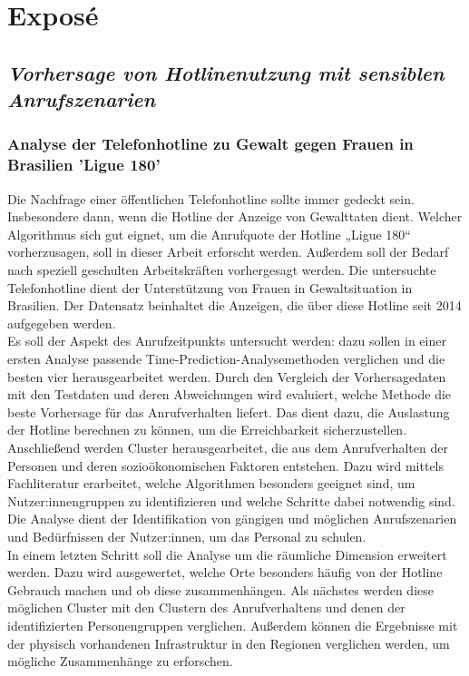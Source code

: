 \documentclass[12pt]{scrartcl}
\begin{document}
	\pagestyle{fancy}
	\renewcommand{\headrulewidth}{0.1 pt}
	\renewcommand{\footrulewidth}{0 pt}
	\section*{Exposé}
	\subsection*{\textit{Vorhersage von Hotlinenutzung mit sensiblen Anrufszenarien}}
	\subsubsection*{Analyse der Telefonhotline zu Gewalt gegen Frauen in Brasilien 'Ligue 180'}
	Die Nachfrage einer öffentlichen Telefonhotline sollte immer gedeckt sein. Insbesondere dann, wenn die Hotline der Anzeige von Gewalttaten dient. Welcher Algorithmus sich gut eignet, um die Anrufquote der Hotline „Ligue 180“ vorherzusagen, soll in dieser Arbeit erforscht werden. Außerdem soll der Bedarf nach speziell geschulten Arbeitskräften vorhergesagt werden. Die untersuchte Telefonhotline dient der Unterstützung von Frauen in Gewaltsituation in Brasilien. Der Datensatz beinhaltet die Anzeigen, die über diese Hotline seit 2014 aufgegeben werden.\\
	Es soll der Aspekt des Anrufzeitpunkts untersucht werden: dazu sollen in einer ersten Analyse passende Time-Prediction-Analysemethoden verglichen und die besten vier herausgearbeitet werden. Durch den Vergleich der Vorhersagedaten mit den Testdaten und deren Abweichungen wird evaluiert, welche Methode die beste Vorhersage für das Anrufverhalten liefert. Das dient dazu, die Auslastung der Hotline berechnen zu können, um die Erreichbarkeit sicherzustellen.\\
	Anschließend werden Cluster herausgearbeitet, die aus dem Anrufverhalten der Personen und deren sozioökonomischen Faktoren entstehen. Dazu wird mittels Fachliteratur erarbeitet, welche Algorithmen besonders geeignet sind, um Nutzer:innengruppen zu identifizieren und welche Schritte dabei notwendig sind. Die Analyse dient der Identifikation von gängigen und möglichen Anrufszenarien und Bedürfnissen der Nutzer:innen, um das Personal zu schulen.\\
	In einem letzten Schritt soll die Analyse um die räumliche Dimension erweitert werden. Dazu wird ausgewertet, welche Orte besonders häufig von der Hotline Gebrauch machen und ob diese zusammenhängen. Als nächstes werden diese möglichen Cluster mit den Clustern des Anrufverhaltens und denen der identifizierten Personengruppen verglichen. Außerdem können die Ergebnisse mit der physisch vorhandenen Infrastruktur in den Regionen verglichen werden, um mögliche Zusammenhänge zu erforschen. 
	

	
\end{document}
